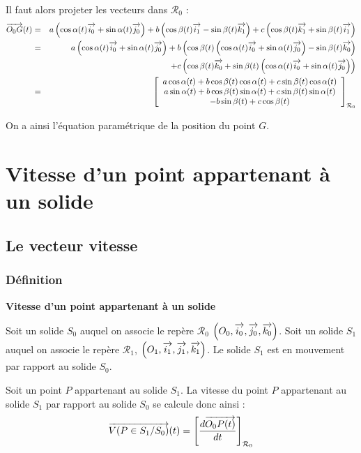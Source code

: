 \documentclass[10pt,oneside]{article}
\begin{document}
\begin{exemple}
Il faut alors projeter les vecteurs dans $\mathcal{R}_0$ : 
\begin{eqnarray*}
\overrightarrow{O_0 G}(t) &=& a \left(\cos\alpha(t) \overrightarrow{i_0} + \sin\alpha(t) \overrightarrow{j_0} \right) 
+ b \left(\cos\beta(t) \overrightarrow{i_1} - \sin\beta(t) \overrightarrow{k_1} \right) 
+ c\left(\cos\beta(t) \overrightarrow{k_1} + \sin\beta(t)\overrightarrow{i_1}\right)\\
&=& a \left(\cos\alpha(t) \overrightarrow{i_0} + \sin\alpha(t) \overrightarrow{j_0} \right) 
+ b \left(\cos\beta(t) \left(\cos\alpha(t) \overrightarrow{i_0} + \sin\alpha(t) \overrightarrow{j_0} \right) - \sin\beta(t) \overrightarrow{k_0} \right) \\
&& + c\left(\cos\beta(t) \overrightarrow{k_0} + \sin\beta(t)  \left(\cos\alpha(t) \overrightarrow{i_0} + \sin\alpha(t) \overrightarrow{j_0} \right) \right)\\
&=& \left[ \begin{array}{c} 
a \cos\alpha(t) + b \cos\beta(t) \cos\alpha(t) +c \sin\beta(t)\cos\alpha(t)\\
a \sin\alpha(t) + b \cos\beta(t) \sin\alpha(t) +c \sin\beta(t)\sin\alpha(t) \\
- b\sin\beta(t) + c\cos\beta(t)
\end{array}\right]_{\mathcal{R}_0}
\end{eqnarray*}

On a ainsi l'équation paramétrique de la position du point $G$.

\vspace{.25cm}

\end{exemple}
\section{Vitesse d'un point appartenant à un solide}

\subsection{Le vecteur vitesse}
\subsubsection{Définition}

\begin{defi}
\textbf{Vitesse d'un point appartenant à un solide}

Soit un solide $S_0$ auquel on associe le repère $\mathcal{R}_0$ $\left(O_0,\overrightarrow{i_0},\overrightarrow{j_0},\overrightarrow{k_0} \right)$.  Soit un solide $S_1$ auquel on associe le repère $\mathcal{R}_1$,  $\left(O_1,\overrightarrow{i_1},\overrightarrow{j_1},\overrightarrow{k_1} \right)$. Le solide $S_1$ est en mouvement par rapport au solide $S_0$. 

Soit un point $P$ appartenant au solide $S_1$. La vitesse du point $P$ appartenant au solide $S_1$ par rapport au solide $S_0$ se calcule donc ainsi : 
$$
\overrightarrow{V(P\in S_1/S_0)}(t) = \left[\dfrac{d\overrightarrow{O_0P(t)}}{dt}\right]_{\mathcal{R}_0}
$$
\end{defi}
\end{document}
